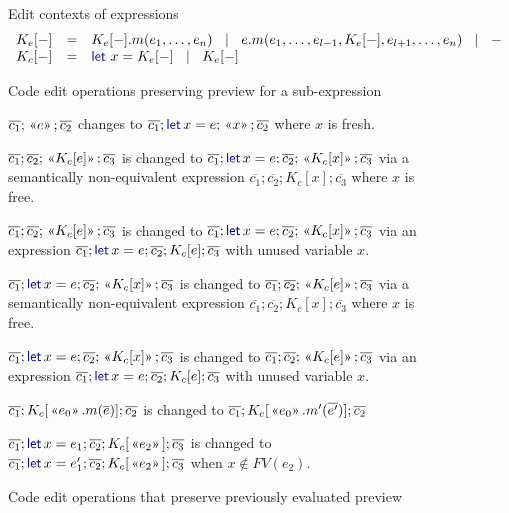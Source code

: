 \documentclass[english,crc,references=cleveref]{programming}
\theoremstyle{plain}
\theoremstyle{definition}
\newcommand{\lsep}{\;\;|\;\;}
\newcommand{\kvd}[1]{\textnormal{\textcolor{kvdclr}{\sffamily #1}}}
\newcommand{\rname}[1]{{\sffamily(#1)}}
\newcommand{\ername}[1]{\vspace{0.75em}\rname{#1}\hspace{0.5em}}
\newcommand{\preview}[1]{\,\textnormal{\guillemotleft} #1\textnormal{\guillemotright}\,}
\begin{document}
\begin{figure}[t]
\raggedright
%
{\sffamily Edit contexts of expressions}
\begin{equation*}
\begin{array}{lcl}
K_e[-] &=& K_e[-].m(e_1, \ldots, e_n) ~\lsep~ e.m(e_1, \ldots, e_{l-1}, K_e[-], e_{l+1},\ldots , e_n) ~\lsep~ -\\
K_c[-] &=& \kvd{let}~x = K_e[-] ~\lsep~ K_e[-]\\
\end{array}
\end{equation*}

%
{\sffamily Code edit operations preserving preview for a sub-expression}

\hspace{2.5em}\begin{minipage}[c]{0.868\textwidth}
  \raggedright\setlength{\parindent}{-1em}

  \ername{let-intro-var}
  $\overline{c_1}; \preview{e}; \overline{c_2}$ changes to
  $\overline{c_1}; \kvd{let}\,x = e; \preview{x}; \overline{c_2}$ where $x$ is fresh.

  \ername{let-intro-ins}
  $\overline{c_1}; \overline{c_2}; \preview{K_c[e]}; \overline{c_3}$ is changed to
  $\overline{c_1}; \kvd{let}\,x=e; \overline{c_2}; \preview{K_c[x]}; \overline{c_3}$ via
  a semantically non-equivalent expression
  $\overline{c_1}; \overline{c_2}; K_c[x]; \overline{c_3}$ where $x$ is free.

  \ername{let-intro-del}
  $\overline{c_1}; \overline{c_2}; \preview{K_c[e]}; \overline{c_3}$ is changed to
  $\overline{c_1}; \kvd{let}\,x=e; \overline{c_2}; \preview{K_c[x]}; \overline{c_3}$ via
  an expression $\overline{c_1}; \kvd{let}\,x=e; \overline{c_2}; K_c[e]; \overline{c_3}$
  with unused variable $x$.

  \ername{let-elim-del}
  $\overline{c_1}; \kvd{let}\,x=e; \overline{c_2}; \preview{K_c[x]}; \overline{c_3}$ is changed to
  $\overline{c_1}; \overline{c_2}; \preview{K_c[e]}; \overline{c_3}$ via
  a semantically non-equivalent expression
  $\overline{c_1}; \overline{c_2}; K_c[x]; \overline{c_3}$ where $x$ is free.

  \ername{let-elim-ins}
  $\overline{c_1}; \kvd{let}\,x=e; \overline{c_2}; \preview{K_c[x]}; \overline{c_3}$ is changed to
  $\overline{c_1}; \overline{c_2}; \preview{K_c[e]}; \overline{c_3}$ via
  an expression $\overline{c_1}; \kvd{let}\,x=e; \overline{c_2}; K_c[e]; \overline{c_3}$
  with unused variable $x$.

  \ername{edit-mem}
  $\overline{c_1}; K_c[\preview{e_0}.m(\overline{e})]; \overline{c_2}$ is changed to
  $\overline{c_1}; K_c[\preview{e_0}.m'(\overline{e'})]; \overline{c_2}$

  \ername{edit-let}
  $\overline{c_1}; \kvd{let}\,x=e_1; \overline{c_2}; K_c[\preview{e_2}]; \overline{c_3}$ is changed to
  $\overline{c_1}; \kvd{let}\,x=e'_1; \overline{c_2}; K_c[\preview{e_2}]; \overline{c_3}$ \hspace{2em} when
  $x\notin FV(e_2)$.
\end{minipage}

\caption{Code edit operations that preserve previously evaluated preview}
\label{fig:operations}
%
\end{figure}
\end{document}
